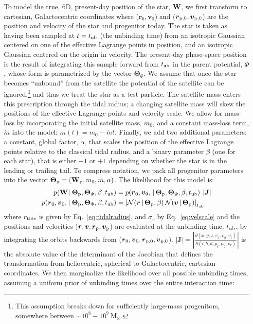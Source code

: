 \documentclass{emulateapj}
\newcommand{\given}{\,|\,}
\newcommand{\msun}{\mathrm{M}_\odot}
\newcommand{\W}{{\bf W}}
\newcommand{\J}{{\boldsymbol J}}
\newcommand{\rtide}{r_{\rm tide}}
\newcommand{\bs}{\boldsymbol}
\newcommand{\sat}{{\rm p}}
\newcommand{\tub}{t_{\rm ub}}
\newcommand{\tailbit}{\beta}
\newcommand{\Loffset}{\alpha}
\begin{document}
To model the true, 6D, present-day position of the star, $\W$, we first transform to cartesian, Galactocentric coordinates where ($\bs{r}_0,\bs{v}_0$) and ($\bs{r}_{\sat,0},\bs{v}_{\sat,0}$) are the position and velocity of the star and progenitor today. The star is taken as having been sampled at $t=\tub$ (the unbinding time) from an isotropic Gaussian centered on one of the effective Lagrange points in position, and an isotropic Gaussian centered on the origin in velocity. The present-day phase-space position is the result of integrating this sample forward from $\tub$ in the parent potential, $\Phi$, whose form is parametrized by the vector $\bs{\Theta}_\Phi$. We assume that once the star becomes ``unbound'' from the satellite the potential of the satellite can be ignored,\footnote{This assumption breaks down for sufficiently large-mass progenitors, somewhere between $\sim10^8-10^9~\msun$.} and thus we treat the star as a test particle. The satellite mass enters this prescription through the tidal radius; a changing satellite mass will skew the positions of the effective Lagrange points and velocity scale. We allow for mass-loss by incorporating the initial satellite mass, $m_0$, and a constant mass-loss term, $\dot{m}$ into the model: $m(t) = m_0 - \dot{m}t$. Finally, we add two additional parameters: a constant, global factor, $\Loffset$, that scales the position of the effective Lagrange points relative to the classical tidal radius, and a binary parameter $\tailbit$ (one for each star), that is either $-1$ or $+1$ depending on whether the star is in the leading or trailing tail. To compress notation, we pack all progenitor parameters into the vector $\bs{\Theta}_\sat = (\W_\sat, m_0, \dot{m}, \Loffset)$. The likelihood for this model is:
\begin{align}
	p(\W \given \bs{\Theta}_\sat, \bs{\Theta}_\Phi, \tailbit, \tub) &= p(\bs{r}_0,\bs{v}_0, \given \bs{\Theta}_\sat, \bs{\Theta}_\Phi, \tailbit, \tub)\,\left\vert\J\right\vert\label{eq:starlike}\\
	p(\bs{r}_0,\bs{v}_0, \given \bs{\Theta}_\sat, \bs{\Theta}_\Phi,\tailbit,\tub) &= \left[\mathcal{N}(\bs{r} \given \bs{\Theta}_\sat, \tailbit)\,\mathcal{N}(\bs{v} \given \bs{\Theta}_\sat)\right]_{\tub}
\end{align}
where $\rtide$ is given by Eq.~\ref{eq:tidalradius}, and $\sigma_v$ by Eq.~\ref{eq:velscale} and the positions and velocities ($\bs{r},\bs{v}, \bs{r}_{\sat},\bs{v}_{\sat}$) are evaluated at the unbinding time, $\tub$, by integrating the orbits backwards from ($\bs{r}_0,\bs{v}_0, \bs{r}_{\sat,0},\bs{v}_{\sat,0}$). $\left\vert\J\right\vert = \left\vert\frac{\partial(x,y,z,v_x,v_y,v_z)}{\partial(l,b,d,\mu_l,\mu_b,v_r)}\right\vert$ is the absolute value of the determinant of the Jacobian that defines the transformation from heliocentric, spherical to Galactocentric, cartesian coordinates. We then marginalize the likelihood over all possible unbinding times, assuming a uniform prior of unbinding times over the entire interaction time:
\end{document}
